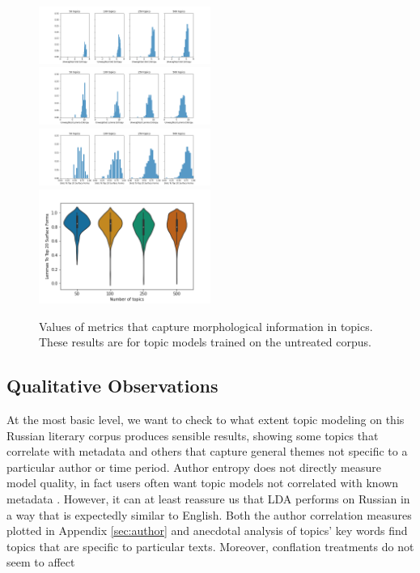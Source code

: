 \documentclass[11pt,a4paper]{article}
\begin{document}
\begin{figure}[t]
    \includegraphics[width=0.5\textwidth]{unweighted_slot_entropy.png}
    \includegraphics[width=0.5\textwidth]{unweighted_lemma_entropy.png}
    \includegraphics[width=0.5\textwidth]{slots_to_top_20_surface_forms.png}
    \includegraphics[width=0.5\textwidth]{lemmas_to_top_20_surface_forms.png}
    \caption{Values of metrics that capture morphological information in topics. These results are for topic models trained on the untreated corpus.}
    \label{fig:slot_lemma_figs}
\end{figure}
\subsection{Qualitative Observations}
At the most basic level, we want to check to what extent topic modeling on this Russian literary corpus produces sensible results, showing some topics that correlate with metadata and others that capture general themes not specific to a particular author or time period. Author entropy does not directly measure model quality, in fact users often want topic models not correlated with known metadata \cite{Thompson2018AuthorlessTM}. However, it can at least reassure us that LDA performs on Russian in a way that is expectedly similar to English. Both the author correlation measures plotted in Appendix \ref{sec:author} and anecdotal analysis of topics' key words find topics that are specific to particular texts. Moreover, conflation treatments do not seem to affect
\end{document}

